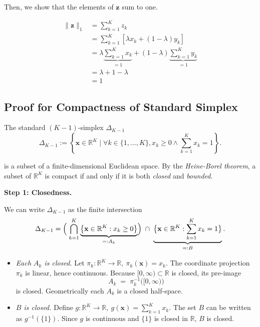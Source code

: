 \documentclass{article}
\begin{document}
Then, we show that the elements of $\mathbf{z}$ sum to one.

$$
\begin{aligned}
\| \mathbf{z} \|_1 &= \sum_{k=1}^K z_k \\
&= \sum_{k=1}^K \left[ \lambda x_k + (1-\lambda) y_k \right] \\
&= \lambda \underbrace{\sum_{k=1}^K x_k}_{=1} + (1-\lambda) \underbrace{\sum_{k=1}^K y_k}_{=1} \\
&= \lambda + 1 - \lambda \\
&= 1
\end{aligned}
$$

\subsection{Proof for Compactness of Standard Simplex}
\label{subsec:compactness_simplex}

The standard $(K-1)$-simplex $\Delta_{K-1}$
\begin{equation}
    \Delta_{K-1} := \left\{ \mathbf{x} \in \mathbb{R}^{K} \mid \forall k \in \{1, ..., K \}, x_k \geq 0 \land \sum_{k=1}^{K} x_k = 1 \right\}.
\end{equation}

is a subset of a finite-dimensional Euclidean space. By the \emph{Heine-Borel theorem}, a subset of $\mathbb R^{K}$ is compact if and only if it is both \emph{closed} and \emph{bounded}.

\textbf{Step 1: Closedness.}

We can write $\Delta_{K-1}$  as the finite intersection
\begin{equation}
   \Delta_{K-1} = \Bigl(\;\bigcap_{k=1}^{K}
          \underbrace{\bigl\{\mathbf x\in\mathbb R^{K}:x_k\ge 0\bigr\}}_{=:A_k}
        \Bigr)
   \;\cap\;
   \underbrace{\bigl\{\mathbf x\in\mathbb R^{K}:\sum_{k=1}^{K}x_k=1\bigr\}}_{=:B}.
\end{equation}

\begin{itemize}
\item\emph{Each $A_k$ is closed.}
      Let $\pi_k:\mathbb R^{K}\to\mathbb R,\ \pi_k(\mathbf x)=x_k$.
      The coordinate projection $\pi_k$ is linear, hence continuous.
      Because $[0,\infty)\subset\mathbb R$ is closed, its pre-image
      \begin{equation}
        A_k \;=\; \pi_k^{-1}\bigl([0,\infty)\bigr)
      \end{equation}
      is closed. Geometrically each $A_k$ is a closed half-space.

\item\emph{$B$ is closed.}
      Define $g:\mathbb R^{K}\to\mathbb R,\ g(\mathbf x)=\sum_{k=1}^{K}x_k$.
      The set $B$ can be written as $g^{-1}(\{1\})$.
      Since $g$ is continuous and $\{1\}$ is closed in $\mathbb R$, $B$ is closed.
\end{itemize}
\end{document}
